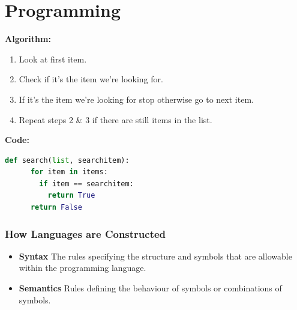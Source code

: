 \documentclass{beamer}
\begin{document}
%
%
\section{Programming}
\begin{frame}[fragile]
  \small 
  \begin{minipage}[t]{0.39\textwidth}
      \textbf{Algorithm:} \\
      \begin{enumerate}
        \item Look at first item.
        \item Check if it's the item we're looking for.
        \item If it's the item we're looking for stop otherwise go to next item.
        \item Repeat steps 2 \& 3 if there are still items in the list.
      \end{enumerate}
  \end{minipage}
  \begin{minipage}[t]{0.59\textwidth}
    \textbf{Code:}
    \begin{lstlisting}[language=Python]
    def search(list, searchitem):
      for item in items:
        if item == searchitem:
          return True
      return False
    \end{lstlisting}
    \hfill
  \end{minipage}
\end{frame}

%
%
\begin{frame}
  \frametitle{How Languages are Constructed}
  \begin{itemize}
    \item \textbf{Syntax} \textrightarrow The rules specifying the structure and symbols that are allowable within the programming language.
    \item \textbf{Semantics} \textrightarrow Rules defining the behaviour of symbols or combinations of symbols.
  \end{itemize}
\end{frame}
\end{document}
